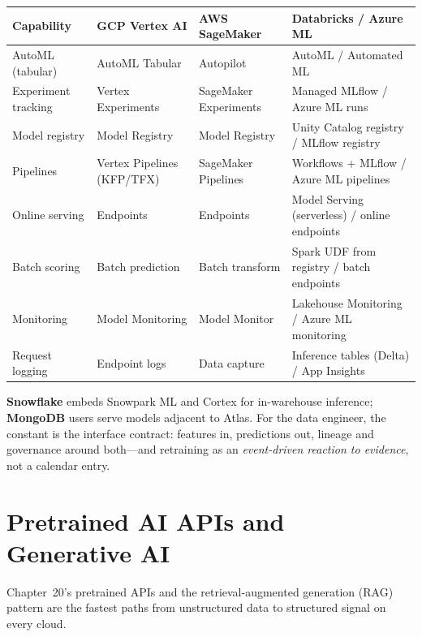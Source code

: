 \begin{center}
\footnotesize
\begin{tabular}{@{}p{2.8cm}p{3.0cm}p{3.0cm}p{3.4cm}@{}}
\toprule
\textbf{Capability} & \textbf{GCP Vertex AI} & \textbf{AWS SageMaker} & \textbf{Databricks / Azure ML} \\
\midrule
AutoML (tabular) & AutoML Tabular & Autopilot & AutoML / Automated ML \\
Experiment tracking & Vertex Experiments & SageMaker Experiments & Managed MLflow / Azure ML runs \\
Model registry & Model Registry & Model Registry & Unity Catalog registry / MLflow registry \\
Pipelines & Vertex Pipelines (KFP/TFX) & SageMaker Pipelines & Workflows + MLflow / Azure ML pipelines \\
Online serving & Endpoints & Endpoints & Model Serving (serverless) / online endpoints \\
Batch scoring & Batch prediction & Batch transform & Spark UDF from registry / batch endpoints \\
Monitoring & Model Monitoring & Model Monitor & Lakehouse Monitoring / Azure ML monitoring \\
Request logging & Endpoint logs & Data capture & Inference tables (Delta) / App Insights \\
\bottomrule
\end{tabular}
\end{center}

\noindent \textbf{Snowflake} embeds Snowpark ML and Cortex for in-warehouse inference;
\textbf{MongoDB} users serve models adjacent to Atlas. For the data engineer, the constant is the
interface contract: features in, predictions out, lineage and governance around both---and
retraining as an \emph{event-driven reaction to evidence}, not a calendar entry.

\section{Pretrained AI APIs and Generative AI}
%
Chapter~20's pretrained APIs and the retrieval-augmented generation (RAG) pattern are the fastest
paths from unstructured data to structured signal on every cloud.


